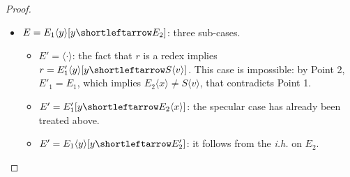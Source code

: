 \documentclass[10pt,a4paper]{article}
\makeatletter
\theoremstyle{remark}
\newcommand{\tmtwo}{u}
\newcommand{\tmfour}{r}
\newcommand{\var}{x}
\newcommand{\vartwo}{y}
\newcommand{\val}{v}
\newcommand{\ctxholep}[1]{\langle #1\rangle}
\newcommand{\ctxhole}{\ctxholep{\cdot}}
\newcommand{\ctxholefp}[1]{\langle #1\rangle}
\newcommand{\llangle}[1][]{\savebox{\@brx}{\(\m@th{#1\langle}\)}
  \mathopen{\copy\@brx\kern-0.7\wd\@brx\usebox{\@brx}}}
\newcommand{\rrangle}[1][]{\savebox{\@brx}{\(\m@th{#1\rangle}\)}
  \mathclose{\copy\@brx\kern-0.7\wd\@brx\usebox{\@brx}}}
\renewcommand{\ctxholefp}[1]{\llangle #1\rrangle}
\newcommand{\evctx}{E}
\newcommand{\evctxtwo}{\evctx'}
\newcommand{\sctx}{S}
\newcommand{\sctxp}[1]{\sctx\ctxholep{#1}}
\newcommand{\esub}[2]{[#1{\shortleftarrow}#2]}
\newcommand{\ih}{{\textit{i.h.}}\xspace}
\makeatother
\begin{document}
\begin{proof}
\begin{enumerate}
\begin{itemize}
\begin{itemize}
			\item $\evctxtwo=\evctxtwo_1\ctxholefp\vartwo\esub\vartwo{\evctxtwo_2}$ with $\evctxtwo_2\ctxholep\tmfour=\tmtwo$: note that $\evctx_1\ctxholefp\var=\evctxtwo_1\ctxholefp\vartwo $ so that by Point 2 the two decompositions coincide. This is absurd because then $\var\neq\vartwo$ while by hypothesis $\evctx$ does not capture $\var$.
		\end{itemize}
		\item $\evctx=\evctx_1\ctxholep\vartwo\esub\vartwo{\evctx_2}$: three sub-cases.
		\begin{itemize}
			\item $\evctxtwo=\ctxhole$: the fact that $\tmfour$ is a redex implies $\tmfour=\evctxtwo_1\ctxholep\vartwo\esub\vartwo{\sctxp\val}$. This case is impossible: by Point 2, $\evctxtwo_1=\evctx_1$, which implies $\evctx_2\ctxholep\var\neq\sctxp\val$, that contradicts Point 1.
			\item $\evctxtwo=\evctxtwo_1\esub\vartwo{\evctx_2\ctxholep\var}$: the specular case has already been treated above.
			\item $\evctxtwo=\evctx_1\ctxholep\vartwo\esub\vartwo{\evctxtwo_2}$: it follows from the \ih on $\evctx_2$.\qedhere
		\end{itemize}
	\end{itemize}
\end{enumerate}
\end{proof}
\end{document}
